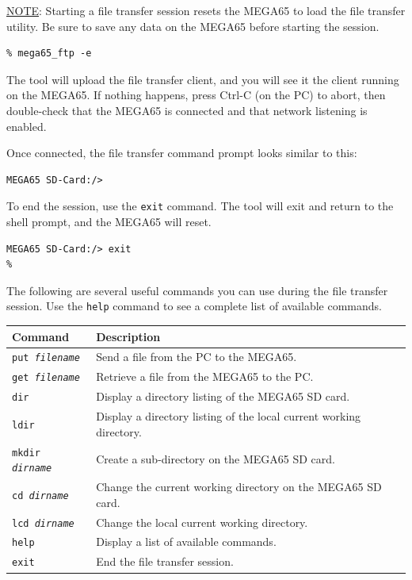 \underline{NOTE}: Starting a file transfer session resets the MEGA65 to load the file transfer utility. Be sure to save any data on the MEGA65 before starting the session.

\begin{verbatim}
% mega65_ftp -e
\end{verbatim}

The tool will upload the file transfer client, and you will see it the client running on the MEGA65. If nothing happens, press Ctrl-C (on the PC) to abort, then double-check that the MEGA65 is connected and that network listening is enabled.

Once connected, the file transfer command prompt looks similar to this:

\begin{verbatim}
MEGA65 SD-Card:/>
\end{verbatim}

To end the session, use the {\tt exit} command. The tool will exit and return to the shell prompt, and the MEGA65 will reset.

\begin{verbatim}
MEGA65 SD-Card:/> exit
%
\end{verbatim}

The following are several useful commands you can use during the file transfer session. Use the {\tt help} command to see a complete list of available commands.

\begin{center}
\begin{tabular}{|l|l|}
\hline
{\bf Command} & {\bf Description} \\
\hline
{\tt put {\it filename}} & Send a file from the PC to the MEGA65. \\
\hline
{\tt get {\it filename}} & Retrieve a file from the MEGA65 to the PC. \\
\hline
{\tt dir} & Display a directory listing of the MEGA65 SD card. \\
\hline
{\tt ldir} & Display a directory listing of the local current working directory. \\
\hline
{\tt mkdir {\it dirname}} & Create a sub-directory on the MEGA65 SD card. \\
\hline
{\tt cd {\it dirname}} & Change the current working directory on the MEGA65 SD card. \\
\hline
{\tt lcd {\it dirname}} & Change the local current working directory. \\
\hline
{\tt help} & Display a list of available commands. \\
\hline
{\tt exit} & End the file transfer session. \\
\hline
\end{tabular}
\end{center}

